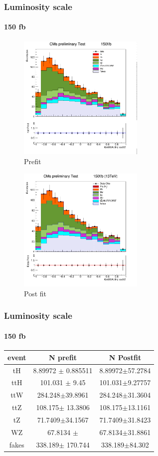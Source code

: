 \documentclass[11pt]{beamer}
\begin{document}
\begin{frame}
\frametitle{Luminosity scale}
\framesubtitle{150 fb}
\begin{multicols}{2}
\begin{center}
	\begin{figure}
		\includegraphics[width=6cm,height=6cm]{figures/150fb/kin.png}
		\caption*{Prefit }
	\end{figure}
\end{center}
\columnbreak
\begin{center}
	\begin{figure}
		\includegraphics[width=6cm,height=6cm]{figures/150fb/simple.png}
		\caption*{Post fit }
	\end{figure}
\end{center}
\end{multicols}
\end{frame}

\begin{frame}
\frametitle{Luminosity scale}
\framesubtitle{150 fb}
\begin{table}
	\begin{tabular}{|c|c|c|}
		\hline
event  & N prefit    & N Postfit \\
\hline
tH & 8.89972 $\pm$  0.885511 & 8.89972$\pm$57.2784\\
\hline
ttH  & 101.031 $\pm$  9.45& 101.031$\pm$9.27757\\
\hline
ttW  & 284.248$\pm$39.8961  & 284.248$\pm$31.3604\\
\hline
ttZ  & 108.175$\pm$  13.3806 & 108.175$\pm$13.1161\\
\hline
tZ & 71.7409$\pm$34.1567  & 71.7409$\pm$31.8423\\
\hline
WZ & 67.8134 $\pm$ & 67.8134$\pm$31.8861\\
\hline
fakes  & 338.189$\pm$  170.744  & 338.189$\pm$84.302\\
\hline
	\end{tabular}
\end{table}
\end{frame}
\end{document}
